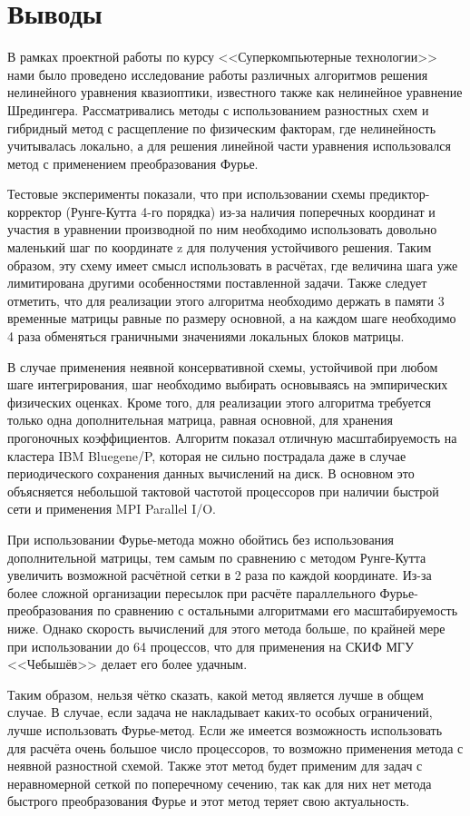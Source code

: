 \section{Выводы}

В рамках проектной работы по курсу <<Суперкомпьютерные технологии>> нами было проведено исследование
работы различных алгоритмов решения нелинейного уравнения квазиоптики, известного также как
нелинейное уравнение Шредингера. Рассматривались методы с использованием разностных схем и гибридный метод с расщепление по физическим факторам, где нелинейность учитывалась локально, а для решения
линейной части уравнения использовался метод с применением преобразования Фурье.


Тестовые эксперименты показали, что при использовании схемы предиктор-корректор (Рунге-Кутта 4-го порядка) из-за наличия поперечных координат и участия в уравнении производной по ним необходимо использовать довольно маленький шаг по координате z для получения устойчивого решения. Таким образом, эту схему имеет смысл использовать в расчётах,
где величина шага уже лимитирована другими особенностями поставленной задачи. Также следует отметить, что для реализации этого алгоритма необходимо держать в памяти 3 временные матрицы равные по размеру основной, а на каждом шаге необходимо 4 раза обменяться граничными значениями локальных блоков матрицы.


В случае применения неявной консервативной схемы, устойчивой при любом шаге интегрирования, шаг необходимо выбирать
основываясь на эмпирических физических оценках. Кроме того, для реализации этого алгоритма требуется только одна дополнительная матрица, равная основной, для хранения прогоночных коэффициентов. Алгоритм показал отличную масштабируемость на кластера IBM Bluegene/P, которая не сильно пострадала даже в случае периодического сохранения данных вычислений на диск. В основном это объясняется небольшой тактовой частотой процессоров при наличии быстрой сети и применения MPI Parallel I/O.


При использовании Фурье-метода можно обойтись без использования дополнительной матрицы, тем самым по сравнению с методом Рунге-Кутта увеличить возможной расчётной сетки в 2 раза по каждой координате. Из-за более сложной организации пересылок при расчёте параллельного Фурье-преобразования по сравнению с остальными алгоритмами его масштабируемость ниже. Однако скорость вычислений для этого метода больше, по крайней мере при использовании до 64 процессов, что для применения на СКИФ МГУ <<Чебышёв>> делает его более удачным.


Таким образом, нельзя чётко сказать, какой метод является лучше в общем случае. В случае, если задача не накладывает каких-то особых ограничений, лучше использовать Фурье-метод. Если же имеется возможность использовать для расчёта очень большое число процессоров, то возможно применения метода с неявной разностной схемой. Также этот метод будет применим для задач с неравномерной сеткой по поперечному сечению, так как для них нет метода быстрого преобразования Фурье и этот метод теряет свою актуальность. 